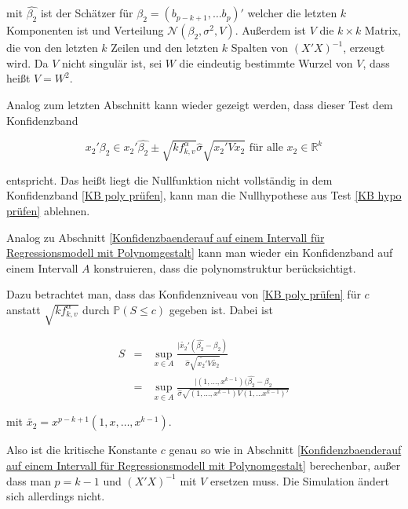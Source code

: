 \documentclass[12pt,a4paper]{article}
\theoremstyle{definition}
\theoremstyle{definition}
\theoremstyle{definition}
\begin{document}
mit $\hat{\beta_2}$ ist der Schätzer für $\beta_2=(b_{p-k+1}, \ldots b_{p})'$ welcher die letzten $k$ Komponenten ist und Verteilung $\mathscr{N}(\beta_2,\sigma^2,V)$. Außerdem ist $V$ die $k \times k$ Matrix, die von den letzten $k$ Zeilen und den letzten $k$ Spalten von $(X'X)^{-1}$, erzeugt wird. Da $V$ nicht singulär ist, sei $W$ die eindeutig bestimmte Wurzel von $V$, dass heißt $V=W^2$. 

Analog zum letzten Abschnitt kann wieder gezeigt werden, dass dieser Test dem Konfidenzband 

\begin{equation}\label{KB poly prüfen}
x_2' \beta_2 \in x_2' \hat{\beta_2} \pm \sqrt{k f^{\alpha}_{k,v}} \hat{\sigma} \sqrt{x_2' V x_2} \text{ für alle } x_2 \in \mathbb{R}^k
\end{equation}

entspricht. Das heißt liegt die Nullfunktion nicht vollständig in dem Konfidenzband \eqref{KB poly prüfen}, kann man die Nullhypothese aus Test \eqref{KB hypo prüfen} ablehnen.

Analog zu Abschnitt \ref{Konfidenzbaenderauf auf einem Intervall für Regressionsmodell mit Polynomgestalt} kann man wieder ein Konfidenzband auf einem Intervall $A$ konstruieren, dass die polynomstruktur berücksichtigt.

Dazu betrachtet man, dass das Konfidenzniveau von \eqref{KB poly prüfen} für $c$ anstatt $\sqrt{k f^{\alpha}_{k,v}}$ durch $\mathbb{P}(S\leq c)$ gegeben ist. Dabei ist

\begin{eqnarray*}
S &=& \sup_{x \in A} \frac{\vert \tilde{x_2}' (\hat{\beta_2}-\beta_2)}{\hat{\sigma} \sqrt{\tilde{x_2'}V\tilde{x_2}}} \\
&=& \sup_{x \in A} \frac{\vert (1, \ldots, x^{k-1})(\hat{\beta_2}-\beta_2}{\hat{\sigma} \sqrt{(1, \ldots, x^{k-1}) V (1, \ldots x^{k-1})'}}
\end{eqnarray*}

mit $\tilde{x_2}= x^{p-k+1}(1, x, \ldots, x^{k-1})$.

Also ist die kritische Konstante $c$ genau so wie in Abschnitt \ref{Konfidenzbaenderauf auf einem Intervall für Regressionsmodell mit Polynomgestalt} berechenbar, außer dass man $p=k-1$ und $(X'X)^{-1}$ mit $V$ ersetzen muss. Die Simulation ändert sich allerdings nicht.
\end{document}

